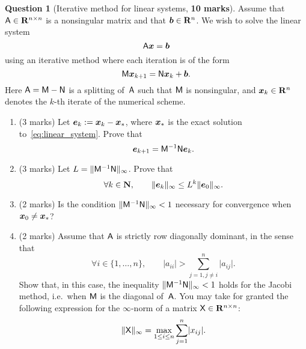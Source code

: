 \documentclass[11pt]{article}
\theoremstyle{definition}
\newtheorem{question}{Question}
\begin{document}
\newpage
\begin{question}
    [Iterative method for linear systems, \textbf{10 marks}]
    Assume that $\mathsf A \in \mathbf R^{n \times n}$ is a nonsingular matrix and that $\mathbf{\boldsymbol{b}} \in \mathbf R^n$.
    We wish to solve the linear system
    \begin{equation}
        \label{eq:linear_system}
        \mathsf A \mathbf{\boldsymbol{x}} = \mathbf{\boldsymbol{b}}
    \end{equation}
    using an iterative method where each iteration is of the form
    \[
        \mathsf M \mathbf{\boldsymbol{x}}_{k+1} = \mathsf N \mathbf{\boldsymbol{x}}_k + \mathbf{\boldsymbol{b}}.
    \]
    Here $\mathsf A = \mathsf M - \mathsf N$ is a splitting of~$\mathsf A$ such that $\mathsf M$ is nonsingular,
    and $\mathbf{\boldsymbol{x}}_k \in \mathbf R^n$ denotes the $k$-th iterate of the numerical scheme.

    \begin{enumerate}
        \item
            (3 marks)
            Let $\mathbf{\boldsymbol{e}}_k := \mathbf{\boldsymbol{x}}_k - \mathbf{\boldsymbol{x}}_*$,
            where $\mathbf{\boldsymbol{x}}_*$ is the exact solution to~\eqref{eq:linear_system}.
            Prove that
            \[
                \mathbf{\boldsymbol{e}}_{k+1} = \mathsf M^{-1} \mathsf N \mathbf{\boldsymbol{e}}_k.
            \]

        \item
            (3 marks)
            Let $L = \lVert\mathsf M^{-1} \mathsf N\rVert_{\infty}$.
            Prove that
            \[
                \forall k \in \mathbf N, \qquad
                \lVert\mathbf{\boldsymbol{e}}_k\rVert_{\infty} \leq L^k \lVert\mathbf{\boldsymbol{e}}_0\rVert_{\infty}.
            \]

        \item
            (2 marks)
            Is the condition $\lVert\mathsf M^{-1} \mathsf N\rVert_{\infty} < 1$ necessary
            for convergence when $\mathbf{\boldsymbol{x}}_0 \neq \mathbf{\boldsymbol{x}}_*$?

        \item
            (2 marks)
            Assume that $\mathsf A$ is strictly row diagonally dominant, in the sense that
            \[
                \forall i \in \{1, \dotsc, n\}, \qquad
                \lvert a_{ii} \rvert > \sum_{j=1, j\neq i}^{n} \lvert a_{ij} \rvert.
            \]
            Show that, in this case, the inequality $\lVert\mathsf M^{-1} \mathsf N\rVert_{\infty} < 1$ holds for the Jacobi method,
            i.e.\ when $\mathsf M$ is the diagonal of~$\mathsf A$.
            You may take for granted the following expression for the $\infty$-norm of a matrix $\mathsf X \in \mathbf R^{n \times n}$:
            \[
                \lVert\mathsf X\rVert_{\infty} = \max_{1 \leq i \leq n} \sum_{j=1}^{n} \lvert x_{ij}\rvert.
            \]


\end{enumerate}
\end{question}
\end{document}

